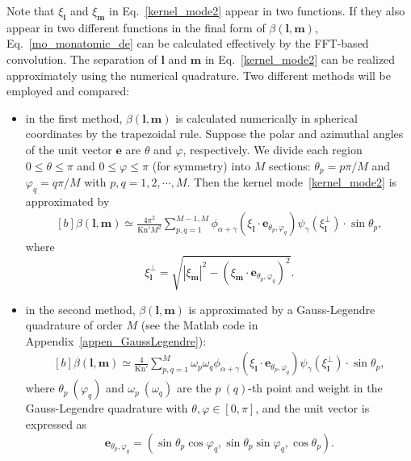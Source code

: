Note that $\xi_{\bm{l}}$ and $\xi_{\bm{m}}$ in Eq.~\eqref{kernel_mode2} appear in two functions. If they also appear in two different functions in the final form of $\beta(\bm{l},\bm{m})$, Eq.~\eqref{mo_monatomic_de} can be calculated effectively by the FFT-based convolution. The separation of $\bm{l}$ and $\bm{m}$ in Eq.~\eqref{kernel_mode2} can be realized approximately using the numerical quadrature. Two different methods will be employed and compared:
\begin{itemize}
    \item  in the first method, $\beta(\bm{l},\bm{m})$ is calculated numerically in spherical coordinates by the trapezoidal rule. Suppose the polar and azimuthal angles of the unit vector $\bm{e}$ are $\theta$ and $\varphi$, respectively. We divide each region $0\le\theta\le\pi$ and $0\le\varphi\le\pi$ (for symmetry) into $M$ sections: $\theta_p=p\pi/M$ and $\varphi_q=q\pi/M$ with $p,q=1,2,\cdots,M$. Then the kernel mode~\eqref{kernel_mode2} is approximated by
    \begin{equation}\label{kernel_FSM_mode}
    \begin{aligned}[b]
    \beta(\bm{l},\bm{m})\simeq\frac{4\pi^2}{\text{Kn}'M^2}\sum_{p,q=1}^{M-1,M}
    \phi_{\alpha+\gamma}(\xi_{\bm{l}}\cdot{\bm{e}_{\theta_p,\varphi_q}})
        \psi_{\gamma}(\xi^\perp_{\bm{l}})
        \cdot\sin\theta_p,
        \end{aligned}
    \end{equation}
    where 
    \begin{equation}
    \xi^\perp_{\bm{l}}=\sqrt{|\xi_{\bm{m}}|^2-(\xi_{\bm{m}}\cdot{\bm{e}}_{\theta_p,\varphi_q})^2}.
    \end{equation}
           
    \item  in the second method, $\beta(\bm{l},\bm{m})$ is approximated by a  Gauss-Legendre quadrature of order $M$ (see the Matlab code in Appendix~\ref{appen_GaussLegendre}):
    \begin{equation} \label{kernel_FSM_modee}
    \begin{aligned}[b]
    \beta(\bm{l},\bm{m})\simeq\frac{4}{\text{Kn}'}\sum_{p,q=1}^{M}{\omega_p\omega_q}
    \phi_{\alpha+\gamma}(\xi_{\bm{l}}\cdot{\bm{e}_{\theta_p,\varphi_q}})\psi_{\gamma}(\xi^\perp_{\bm{l}})\cdot\sin\theta_p,
        \end{aligned}
    \end{equation}
            where $\theta_p\ (\varphi_q)$ and $\omega_p\  (\omega_q)$ are the $p\ (q)$-th point and weight in the Gauss-Legendre quadrature with  $\theta, \varphi\in[0,\pi]$, and the unit vector is expressed as
            \begin{equation}
           \bm{e}_{\theta_p,\varphi_q}=(\sin\theta_p\cos\varphi_q,\sin\theta_p\sin\varphi_q,\cos\theta_p).
            \end{equation}
\end{itemize}

